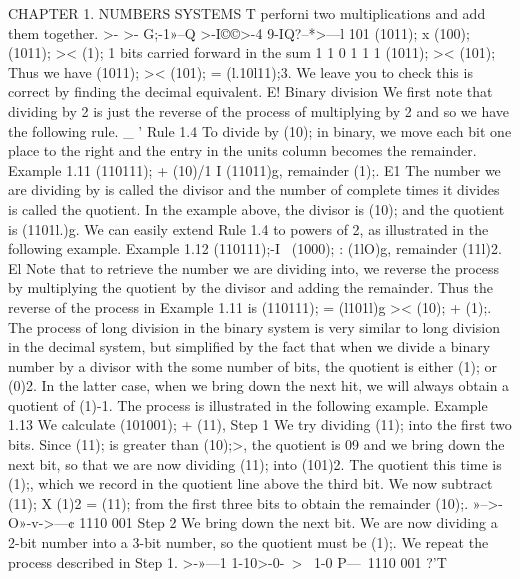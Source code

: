 CHAPTER 1. NUMBERS SYSTEMS T
perforni two multiplications and add them together.
>- >-
G;-1»--Q
>-I©©>-4
9-IQ?--*>—l
101
(1011); x (100);
(1011); >< (1);
1 bits carried forward in the sum
1 1 0 1 1 1 (1011); >< (101);
Thus we have (1011); >< (101); = (l.10l11);3. We leave you to check this is correct by ﬁnding the
decimal equivalent. E!
Binary division
We ﬁrst note that dividing by 2 is just the reverse of the process of multiplying by 2 and so we
have the following rule. _ '
Rule 1.4 To divide by (10); in binary, we move each bit one place to the right and the entry in
the units column becomes the remainder.
Example 1.11 (110111); + (10)/1 I (11011)g, remainder (1);. E1
The number we are dividing by is called the divisor and the number of complete times it divides
is called the quotient. In the example above, the divisor is (10); and the quotient is (1101l.)g.
We can easily extend Rule 1.4 to powers of 2, as illustrated in the following example.
Example 1.12 (110111);-I~ (1000); : (1lO)g, remainder (11l)2. El
Note that to retrieve the number we are dividing into, we reverse the process by multiplying the
quotient by the divisor and adding the remainder. Thus the reverse of the process in Example 1.11
is
(110111); = (l101l)g >< (10); + (1);.
The process of long division in the binary system is very similar to long division in the decimal
system, but simpliﬁed by the fact that when we divide a binary number by a divisor with the some
number of bits, the quotient is either (1); or (0)2. In the latter case, when we bring down the next
hit, we will always obtain a quotient of (1)-1. The process is illustrated in the following example.
Example 1.13 We calculate (101001); + (11),
Step 1 We try dividing (11); into the ﬁrst two bits. Since (11); is greater than (10);>, the quotient
is 09 and we bring down the next bit, so that we are now dividing (11); into (101)2. The
quotient this time is (1);, which we record in the quotient line above the third bit. We now
subtract (11); X (1)2 = (11); from the ﬁrst three bits to obtain the remainder (10);.
»-->-
O»-v->—¢
1110 001
Step 2 We bring down the next bit. We are now dividing a 2-bit number into a 3-bit number, so
the quotient must be (1);. We repeat the process described in Step 1.
>-»—1
1-10>-0-~>~
1-0 P—\
1110 001
?'T

